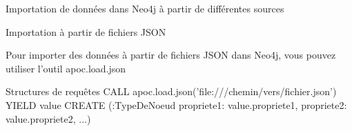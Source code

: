 \begin{frame}{Importation de données dans Neo4j à partir de différentes sources}
  \begin{block}{Importation à partir de fichiers JSON}
 
Pour importer des données à partir de fichiers JSON dans Neo4j, vous pouvez utiliser l'outil apoc.load.json
  \end{block}
  \begin{block}{Structures de requêtes}
CALL apoc.load.json('file:///chemin/vers/fichier.json') YIELD value
CREATE (:TypeDeNoeud {propriete1: value.propriete1, propriete2: value.propriete2, ...})

  \end{block}
\end{frame}